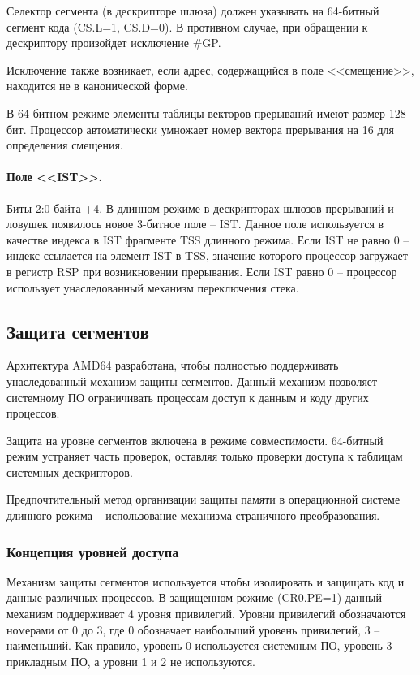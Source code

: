 Селектор сегмента (в дескрипторе шлюза) должен указывать на 64-битный сегмент кода (CS.L=1, CS.D=0).
В противном случае, при обращении к дескриптору произойдет исключение \#GP.

Исключение также возникает, если адрес, содержащийся в поле <<смещение>>, находится не в канонической форме.

В 64-битном режиме элементы таблицы векторов прерываний имеют размер 128 бит. Процессор автоматически
умножает номер вектора прерывания на 16 для определения смещения.

\paragraph{Поле <<IST>>.} Биты 2:0 байта +4. В длинном режиме в дескрипторах шлюзов прерываний и ловушек
появилось новое 3-битное поле -- IST. Данное поле используется в качестве индекса в IST фрагменте TSS длинного режима.
Если IST не равно 0 -- индекс ссылается на элемент IST в TSS, значение которого процессор загружает в регистр RSP при
возникновении прерывания. Если IST равно 0 -- процессор использует унаследованный механизм переключения стека.

\subsection{Защита сегментов}
Архитектура AMD64 разработана, чтобы полностью поддерживать унаследованный механизм защиты сегментов.
Данный механизм позволяет системному ПО ограничивать процессам доступ к данным и коду других процессов.

Защита на уровне сегментов включена в режиме совместимости. 64-битный режим устраняет часть проверок,
оставляя только проверки доступа к таблицам системных дескрипторов.

Предпочтительный метод организации защиты памяти в операционной системе длинного режима -- использование
механизма страничного преобразования.

\subsubsection*{Концепция уровней доступа}
Механизм защиты сегментов используется чтобы изолировать и защищать код и данные различных процессов. В защищенном
режиме (CR0.PE=1) данный механизм поддерживает 4 уровня привилегий. Уровни привилегий обозначаются номерами от 0 до 3,
где 0 обозначает наибольший уровень привилегий, 3 -- наименьший. Как правило, уровень 0 используется системным ПО,
уровень 3 -- прикладным ПО, а уровни 1 и 2 не используются.

